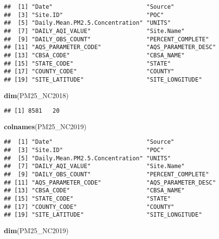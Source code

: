 \documentclass[
]{article}
\newenvironment{Shaded}{\begin{snugshade}}{\end{snugshade}}
\newcommand{\KeywordTok}[1]{\textcolor[rgb]{0.13,0.29,0.53}{\textbf{#1}}}
\newcommand{\NormalTok}[1]{#1}
\begin{document}
\begin{verbatim}
##  [1] "Date"                           "Source"                        
##  [3] "Site.ID"                        "POC"                           
##  [5] "Daily.Mean.PM2.5.Concentration" "UNITS"                         
##  [7] "DAILY_AQI_VALUE"                "Site.Name"                     
##  [9] "DAILY_OBS_COUNT"                "PERCENT_COMPLETE"              
## [11] "AQS_PARAMETER_CODE"             "AQS_PARAMETER_DESC"            
## [13] "CBSA_CODE"                      "CBSA_NAME"                     
## [15] "STATE_CODE"                     "STATE"                         
## [17] "COUNTY_CODE"                    "COUNTY"                        
## [19] "SITE_LATITUDE"                  "SITE_LONGITUDE"
\end{verbatim}

\begin{Shaded}
\begin{Highlighting}[]
\KeywordTok{dim}\NormalTok{(PM25_NC2018)}
\end{Highlighting}
\end{Shaded}

\begin{verbatim}
## [1] 8581   20
\end{verbatim}

\begin{Shaded}
\begin{Highlighting}[]
\KeywordTok{colnames}\NormalTok{(PM25_NC2019)}
\end{Highlighting}
\end{Shaded}

\begin{verbatim}
##  [1] "Date"                           "Source"                        
##  [3] "Site.ID"                        "POC"                           
##  [5] "Daily.Mean.PM2.5.Concentration" "UNITS"                         
##  [7] "DAILY_AQI_VALUE"                "Site.Name"                     
##  [9] "DAILY_OBS_COUNT"                "PERCENT_COMPLETE"              
## [11] "AQS_PARAMETER_CODE"             "AQS_PARAMETER_DESC"            
## [13] "CBSA_CODE"                      "CBSA_NAME"                     
## [15] "STATE_CODE"                     "STATE"                         
## [17] "COUNTY_CODE"                    "COUNTY"                        
## [19] "SITE_LATITUDE"                  "SITE_LONGITUDE"
\end{verbatim}

\begin{Shaded}
\begin{Highlighting}[]
\KeywordTok{dim}\NormalTok{(PM25_NC2019)}
\end{Highlighting}
\end{Shaded}
\end{document}
